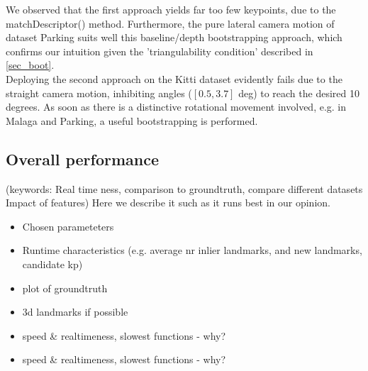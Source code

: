 We observed that the first approach yields far too few keypoints, due to the matchDescriptor() method. Furthermore, the pure lateral camera motion of dataset Parking suits well this baseline/depth bootstrapping approach, which confirms our intuition given the 'triangulability condition' described in \cref{sec_boot}.\\

Deploying the second approach on the Kitti dataset evidently fails due to the straight camera motion, inhibiting angles ($[0.5, 3.7]$ deg) to reach the desired 10 degrees. As soon as there is a distinctive rotational movement involved, e.g. in Malaga and Parking, a useful bootstrapping is performed.


\subsection{Overall performance}
(keywords: Real time ness, comparison to groundtruth, compare different datasets
Impact of features) Here we describe it such as it runs best in our opinion.

\begin{itemize}
	\item Chosen parameteters
	\item Runtime characteristics (e.g. average nr inlier landmarks, and new landmarks, candidate kp)
	\item plot of groundtruth
	\item 3d landmarks if possible
	\item speed \& realtimeness, slowest functions - why?
	\item speed \& realtimeness, slowest functions - why?
\end{itemize}

